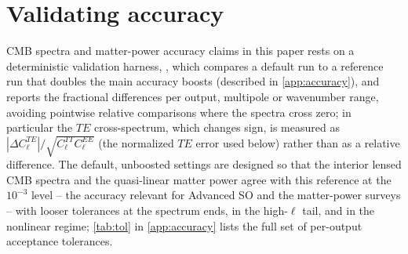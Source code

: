 \documentclass[prd, twocolumn, superscriptaddress, tightenlines, longbibliography, nofootinbib, eqsecnum, amsfonts, amsmath, floatfix, notitlepage]{revtex4-2}
\newcommand{\code}[1]{\texttt{\detokenize{#1}}}
\begin{document}
\section{Validating accuracy}
\label{sec:validation}

CMB spectra and matter-power accuracy claims in this paper rests on a deterministic validation harness,
\code{camb.check_accuracy}, which compares a default run to a reference run that
doubles the main accuracy boosts (described in \cref{app:accuracy}), and reports
the fractional differences per output, multipole or wavenumber range, avoiding
pointwise relative comparisons where the spectra cross zero; in particular the
$TE$ cross-spectrum, which changes sign, is measured as
$|\Delta C_\ell^{TE}|/\sqrt{C_\ell^{TT}C_\ell^{EE}}$ (the normalized $TE$ error
used below) rather than as a relative difference. The default,
unboosted settings are designed so that the interior lensed CMB spectra and the
quasi-linear matter power agree with this reference at the $10^{-3}$ level --
the accuracy relevant for Advanced SO and the matter-power surveys -- with
looser tolerances at the spectrum ends, in the high-$\ell$ tail, and in the
nonlinear regime; \cref{tab:tol} in \cref{app:accuracy} lists the full set of
per-output acceptance tolerances.
\end{document}
